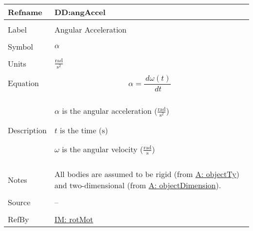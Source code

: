 \documentclass[12pt]{article}
\begin{document}
\vspace{\baselineskip}
\noindent
\begin{minipage}{\textwidth}
\begin{tabular}{>{\raggedright}p{}>{\raggedright\arraybackslash}p{}}
\toprule \textbf{Refname} & \textbf{DD:angAccel}
\label{DD:angAccel}
\\ \midrule \\
Label & Angular Acceleration
        
\\ \midrule \\
Symbol & $α$
         
\\ \midrule \\
Units & $\frac{\text{rad}}{\text{s}^{2}}$
        
\\ \midrule \\
Equation & \begin{displaymath}
           α=\frac{\,dω\left(t\right)}{\,dt}
           \end{displaymath}
\\ \midrule \\
Description & \begin{symbDescription}
              \item{$α$ is the angular acceleration ($\frac{\text{rad}}{\text{s}^{2}}$)}
              \item{$t$ is the time (${\text{s}}$)}
              \item{$ω$ is the angular velocity ($\frac{\text{rad}}{\text{s}}$)}
              \end{symbDescription}
\\ \midrule \\
Notes & All bodies are assumed to be rigid (from \hyperref[assumpOT]{A: objectTy}) and two-dimensional (from \hyperref[assumpOD]{A: objectDimension}).
        
\\ \midrule \\
Source & --
         
\\ \midrule \\
RefBy & \hyperref[IM:rotMot]{IM: rotMot}
        
\\ \bottomrule
\end{tabular}
\end{minipage}
\end{document}
